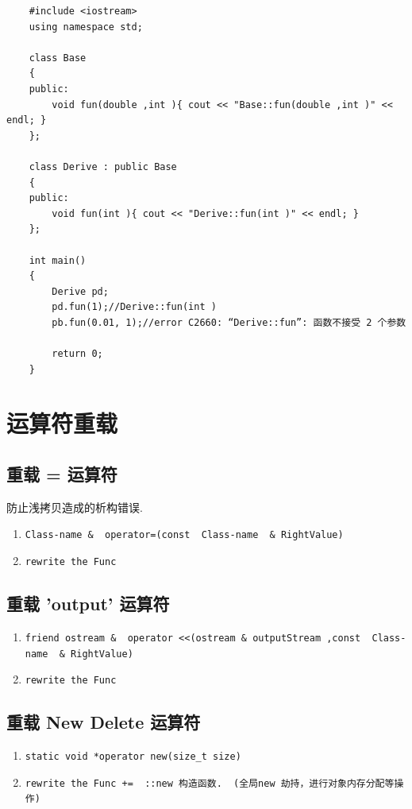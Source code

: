 \documentclass[UTF8,a4paper,12pt]{ctexbook} %
\begin{document}
        \begin{lstlisting}
	#include <iostream>
	using namespace std;
	
	class Base
	{
	public:
		void fun(double ,int ){ cout << "Base::fun(double ,int )" << endl; }
	};
	
	class Derive : public Base
	{
	public:
		void fun(int ){ cout << "Derive::fun(int )" << endl; }
	};
	
	int main()
	{
		Derive pd;
		pd.fun(1);//Derive::fun(int )
		pb.fun(0.01, 1);//error C2660: “Derive::fun”: 函数不接受 2 个参数

		return 0;
	}
        \end{lstlisting}
     \section{运算符重载}
        
	        \subsection{重载 = 运算符}
		        防止浅拷贝造成的析构错误.
	        
		        \begin{enumerate}[fullwidth,itemindent=2em]
		        	\item  \verb|Class-name &  operator=(const  Class-name  & RightValue)|
		        	\item  \verb|rewrite the Func|
		        \end{enumerate}
	        
	        \subsection{重载 'output' 运算符}
		        \begin{enumerate}[fullwidth,itemindent=2em]
		        	\item  \verb|friend ostream &  operator <<(ostream & outputStream ,const  Class-name  & RightValue)|
		        	\item  \verb|rewrite the Func|
		        \end{enumerate}
		        
	         \subsection{重载 New Delete 运算符}
		         \begin{enumerate}[fullwidth,itemindent=2em]
		         	\item  \verb|static void *operator new(size_t size)|
		         	\item  \verb|rewrite the Func +=  ::new 构造函数.  (全局new 劫持，进行对象内存分配等操作)|
		         \end{enumerate}
	         
\end{document}
